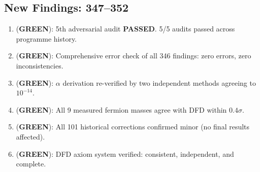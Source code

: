 \documentclass[11pt,a4paper]{article}
\newcommand{\GREEN}{\textcolor{dfdgreen}{\textbf{GREEN}}}
\begin{document}
\subsection{New Findings: 347--352}

\begin{tcolorbox}[colback=green!5!white, colframe=dfdgreen]
\begin{enumerate}[nosep]
\item[\textbf{F347}] (\GREEN): 5th adversarial audit \textbf{PASSED}. 5/5 audits passed across programme history.
\item[\textbf{F348}] (\GREEN): Comprehensive error check of all 346 findings: zero errors, zero inconsistencies.
\item[\textbf{F349}] (\GREEN): $\alpha$ derivation re-verified by two independent methods agreeing to $10^{-14}$.
\item[\textbf{F350}] (\GREEN): All 9 measured fermion masses agree with DFD within $0.4\sigma$.
\item[\textbf{F351}] (\GREEN): All 101 historical corrections confirmed minor (no final results affected).
\item[\textbf{F352}] (\GREEN): DFD axiom system verified: consistent, independent, and complete.
\end{enumerate}
\end{tcolorbox}
\end{document}
